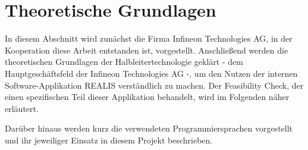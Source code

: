 \chapter{Theoretische Grundlagen}\label{Chap:TheoretischeGrundlagen}
In diesem Abschnitt wird zunächst die Firma Infineon Technologies AG, in der Kooperation diese Arbeit entstanden ist, vorgestellt. Anschließend werden die theoretischen Grundlagen der Halbleitertechnologie geklärt - dem Hauptgeschäftsfeld der Infineon Technologies AG -, um den Nutzen der internen Software-Applikation \gls{REALIS} verständlich zu machen. Der Feasibility Check, der einen spezifischen Teil dieser Applikation behandelt, wird im Folgenden näher erläutert.

Darüber hinaus werden kurz die verwendeten Programmiersprachen vorgestellt und ihr jeweiliger Einsatz in diesem Projekt beschrieben.






